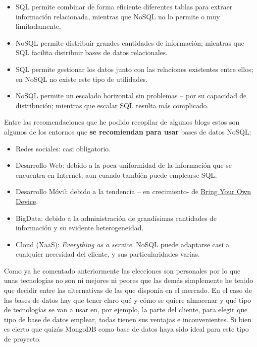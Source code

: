   \begin{itemize}
    \item SQL permite combinar de forma eficiente diferentes tablas para extraer información relacionada, mientras que NoSQL no lo permite o muy limitadamente.
    \item NoSQL permite distribuir grandes cantidades de información; mientras que SQL facilita distribuir bases de datos relacionales.
    \item SQL permite gestionar los datos junto con las relaciones existentes entre ellos; en NoSQL no existe este tipo de utilidades.
    \item NoSQL permite un escalado horizontal sin problemas – por su capacidad de distribución; mientras que escalar SQL resulta más complicado.
   \end{itemize}
   
    Entre las recomendaciones que he podido recopilar de algunos blogs \cite{blog1} \cite{blog2}  estos son algunos de los entornos que \textbf{se recomiendan para usar} bases de datos NoSQL:
    
      \begin{itemize}
      \item Redes sociales: casi obligatorio.
	  \item Desarrollo Web: debido a la poca uniformidad de la información que se encuentra en Internet; aun cuando también puede emplearse SQL.
  \item Desarrollo Móvil: debido a la tendencia – en crecimiento- de \href{https://es.wikipedia.org/wiki/Bring_your_own_device
}{Bring Your Own Device}.
  \item BigData: debido a la administración de grandísimas cantidades de información y su evidente heterogeneidad.
  \item Cloud (XaaS): \textit{Everything as a service}. NoSQL puede adaptarse casi a cualquier necesidad del cliente, y sus particularidades varias.
    \end{itemize}
   
    Como ya he comentado anteriormente las elecciones son personales por lo que unas tecnologías no son ni mejores ni peores que las demás simplemente he tenido que decidir entre las alternativas de las que disponía en el mercado. En el caso de las bases de datos hay que tener claro qué y cómo se quiere almacenar y qué tipo de tecnologías se van a usar en, por ejemplo, la parte del cliente, para elegir que tipo de base de datos emplear, todas tienen sus ventajas e inconvenientes. Si bien es cierto que quizás MongoDB como base de datos haya sido ideal para este tipo de proyecto.


